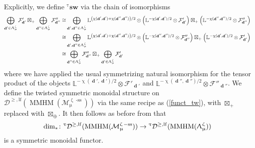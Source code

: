 \documentclass[a4paper,10pt]{amsart}
\renewcommand{\zeta}{\upzeta}
\renewcommand{\chi}{\upchi}
\renewcommand{\Lambda}{\Uplambda}
\renewcommand{\tau}{\uptau}
\renewcommand{\mu}{\upmu}
\newcommand{\LL}{\mathbb{L}}
\newcommand{\Msp}{\mathcal{M}}
\DeclareMathOperator{\sst}{-ss}
\DeclareMathOperator{\MMHM}{MMHM}
\DeclareMathOperator{\dd}{\mathbf{d}}
\newcommand{\Dulf}{\mathcal{D}^{\geq, \mathrm{lf}}}
\begin{document}
Explicitly, we define ${}^{\tau}\mathbf{sw}$ via the chain of isomorphisms
\begin{align}
\label{funct_tw}
\bigoplus_{\dd'\in\Lambda_{\mu}^{\zeta}}\mathcal{F}'_{\dd'}\boxtimes_+ \bigoplus_{\dd''\in\Lambda_{\mu}^{\zeta}}\mathcal{F}''_{\dd''}\cong&\bigoplus_{\dd',\dd''\in\Lambda_{\mu}^{\zeta}} \LL^{\left(\chi(\dd',\dd')+\chi(\dd'',\dd'')\right)/2}\otimes \left(\LL^{-\chi(\dd',\dd')/2}\otimes\mathcal{F}'_{\dd'}\right)\boxtimes_+\left(\LL^{-\chi(\dd'',\dd'')/2}\otimes\mathcal{F}''_{\dd''}\right)
\\ \cong&\bigoplus_{\dd',\dd''\in\Lambda_{\mu}^{\zeta}} \LL^{\left(\chi(\dd',\dd')+\chi(\dd'',\dd'')\right)/2}\otimes \left(\LL^{-\chi(\dd'',\dd'')/2}\otimes\mathcal{F}''_{\dd''}\right)\boxtimes_+\left(\LL^{-\chi(\dd',\dd')/2}\otimes\mathcal{F}'_{\dd'}\right)\nonumber 
\\ \cong &\bigoplus_{\dd''\in\Lambda_{\mu}^{\zeta}}\mathcal{F}''_{\dd''}\boxtimes_+ \bigoplus_{\dd'\in\Lambda_{\mu}^{\zeta}}\mathcal{F}'_{\dd'}\nonumber
\end{align}
where we have applied the usual symmetrizing natural isomorphism for the tensor product of the objects $\LL^{-\chi(\dd',\dd')/2}\otimes\mathcal{F}'_{\dd'}$ and $\LL^{-\chi(\dd'',\dd'')/2}\otimes\mathcal{F}''_{\dd''}$.  We define the twisted symmetric monoidal structure on $\Dulf(\MMHM(\Msp_{\mu}^{\zeta\sst}))$ via the same recipe as (\ref{funct_tw}), with $\boxtimes_+$ replaced with $\boxtimes_{\oplus}$.  It then follows as before from \cite{MSS11} that 
\[
\dim_*\colon{}^{\tau}\Dulf(\MMHM(\Msp_{\mu}^{\zeta\sst}))\rightarrow {}^{\tau}\Dulf(\MMHM(\Lambda_{\mu}^{\zeta}))
\]
is a symmetric monoidal functor.
\end{document}
